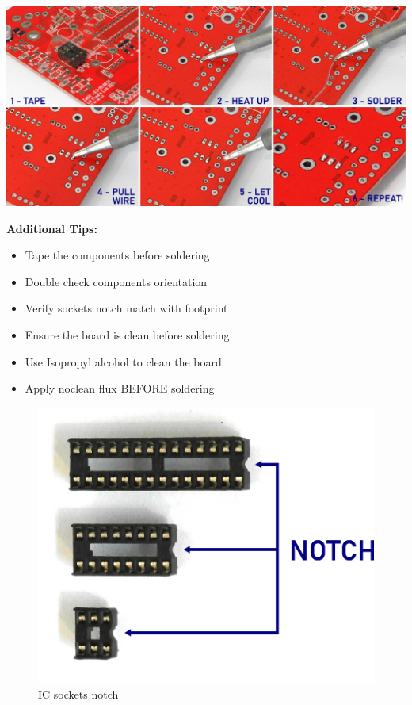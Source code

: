 \documentclass{scrartcl}
\begin{document}
\vspace{0.25cm}
\begin{center}
    \includegraphics[scale=0.65]{assets/solder-strip.jpg}
\end{center}

\pagebreak
\textbf{Additional Tips:}

\begin{itemize}
    \item Tape the components before soldering
    \item Double check components orientation
    \item Verify sockets notch match with footprint
    \item Ensure the board is clean before soldering
    \item Use Isopropyl alcohol to clean the board
    \item Apply noclean flux BEFORE soldering
\end{itemize}

\vspace{0.25cm}

\begin{figure}[!ht]
    \begin{center}
        \includegraphics[scale=0.40]{assets/ic-notch.png}
        \caption{IC sockets notch}
    \end{center}
\end{figure}
\end{document}
